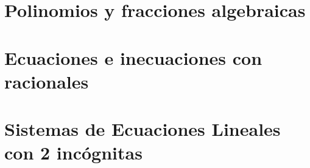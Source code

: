 
\section{Polinomios y fracciones algebraicas}



\section{Ecuaciones e inecuaciones con racionales}



\section{Sistemas de Ecuaciones Lineales con 2 incógnitas}





